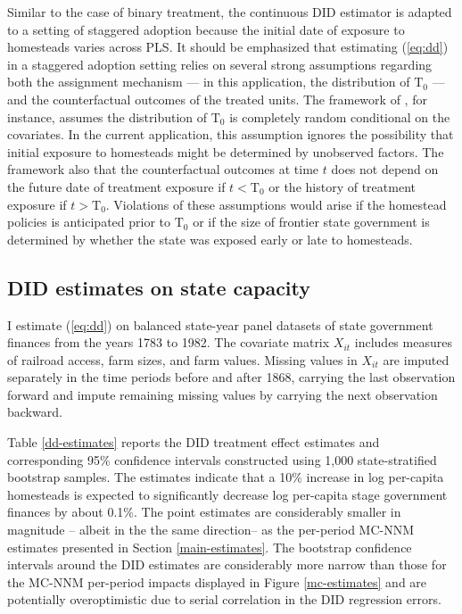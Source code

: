 Similar to the case of binary treatment, the continuous DID estimator is adapted to a setting of staggered adoption because the initial date of exposure to homesteads varies across PLS. It should be emphasized that estimating (\ref{eq:dd}) in a staggered adoption setting relies on several strong assumptions regarding both the assignment mechanism --- in this application, the distribution of $\text{T}_0$ --- and the counterfactual outcomes of the treated units. The framework of \citet{athey2018design}, for instance, assumes the distribution of $\text{T}_0$ is completely random conditional on the covariates. In the current application, this assumption ignores the possibility that initial exposure to homesteads might be determined by unobserved factors. The framework also that the counterfactual outcomes at time $t$ does not depend on the future date of treatment exposure if $t <  \text{T}_0$ or the history of treatment exposure if $t >  \text{T}_0$. Violations of these assumptions would arise if the homestead policies is anticipated prior to $\text{T}_0$ or if the size of frontier state government is determined by whether the state was exposed early or late to homesteads. 

\subsection{DID estimates on state capacity}

I estimate (\ref{eq:dd}) on balanced state-year panel datasets of state government finances from the years 1783 to 1982. The covariate matrix $X_{it}$ includes measures of railroad access, farm sizes, and farm values. Missing values in $X_{it}$ are imputed separately in the time periods before and after 1868, carrying the last observation forward and impute remaining missing values by carrying the next observation backward.

Table \ref{dd-estimates} reports the DID treatment effect estimates and corresponding 95\% confidence intervals constructed using 1,000 state-stratified bootstrap samples. The estimates indicate that a 10\% increase in log per-capita homesteads is expected to significantly decrease log per-capita stage government finances by about 0.1\%. The point estimates are considerably smaller in magnitude -- albeit in the the same direction-- as the per-period MC-NNM estimates presented in Section \ref{main-estimates}. The bootstrap confidence intervals around the DID estimates are considerably more narrow than those for the MC-NNM per-period impacts displayed in Figure \ref{mc-estimates} and are potentially overoptimistic due to serial correlation in the DID regression errors.

